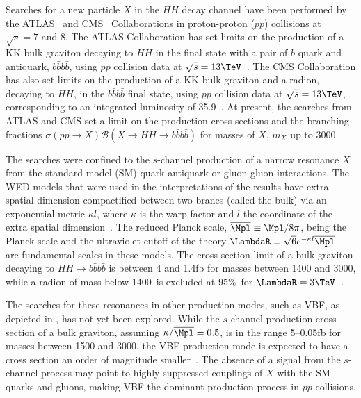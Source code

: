 Searches for a new particle $X$ in the $HH$ decay channel have been performed by the
ATLAS~\cite{Aad:2014yja, Aad:2015uka, Aad:2015xja} and
CMS~\cite{Khachatryan:2014jya, Khachatryan:2015year, Khachatryan:2015tha,Khachatryan:2016sey,Khachatryan:2016cfa}
Collaborations in proton-proton ($ p  p $) collisions at $\sqrt{s} =  7$ and 8\TeV.
The ATLAS Collaboration has set limits on the production of a KK bulk graviton decaying to $HH$ in the final state with a pair of $ b $ quark and antiquark, $ b\bar{b}  b\bar{b} $, using $ p  p $ collision data at $\sqrt{s} = 13\TeV$~\cite{Aaboud:2016xco,ATLAS-CONF-2016-049,Aaboud:2018knk}.
The CMS Collaboration has also set limits on the production of a KK bulk graviton and a radion, decaying to $HH$, in the $ b\bar{b}  b\bar{b} $ final state, using $ p  p $ collision data at $\sqrt{s} = 13\TeV$, corresponding to an integrated luminosity of 35.9\fbinv~\cite{CMS-B2G-16-026,CMS-B2G-17-019}. 
At present, the searches from ATLAS and CMS set a limit on the production cross sections and the branching fractions $\sigma( p  p  \to  X ) \mathcal{B}( X  \to  H  H  \to  b\bar{b}   b\bar{b} )$ for masses of $X$, $m_{X}$ up to 3000\GeV.

The searches were confined to the $s$-channel production of a narrow resonance $X$ from the standard model (SM) quark-antiquark or gluon-gluon interactions. 
The WED models that were used in the interpretations of the results have extra spatial dimension compactified between two branes (called the bulk) via an exponential metric ${\kappa l}$, where $\kappa$ is the warp factor and $l$ the coordinate of the extra spatial dimension~\cite{Giudice:2000av}. 
The reduced Planck scale, $\overline{\Mpl} \equiv \Mpl/8\pi$, \Mpl being the Planck scale and the ultraviolet cutoff of the theory $\LambdaR \equiv \sqrt{6} e^{-\kappa l} \overline{\Mpl}$~\cite{Goldberger:1999uk} are fundamental scales in these models.
The cross section limit of a bulk graviton decaying to $ H  H  \to  b\bar{b}   b\bar{b} $ is between 4 and 1.4\unit{fb} for masses between 1400 and 3000\GeV, while a radion of mass below 1400\GeV\ is excluded at 95\%~\cl for $\LambdaR = 3\TeV$~\cite{CMS-B2G-16-026}.

The searches for these resonances in other production modes, such as VBF, as depicted in , has not yet been explored.
While the $s$-channel production cross section of a bulk graviton, assuming $\kappa/\overline{\Mpl} = 0.5$, is in the range 5--0.05\unit{fb} for masses between 1500 and 3000\GeV, the VBF production mode is expected to have a cross section an order of magnitude smaller~\cite{TheoryReview}.
The absence of a signal from the $s$-channel process may point to highly suppressed couplings of $X$ with the SM quarks and gluons, making VBF the dominant production process in $ p  p $ collisions.
 
